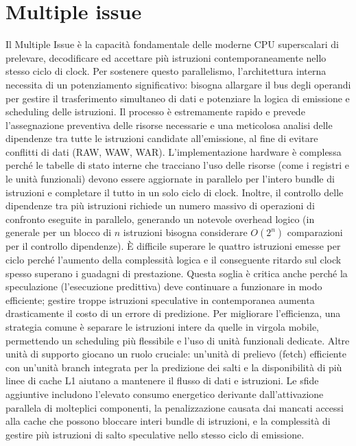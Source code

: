 \section{Multiple issue}
Il Multiple Issue è la capacità fondamentale delle moderne CPU superscalari di prelevare, decodificare ed accettare più istruzioni contemporaneamente nello stesso ciclo di clock. Per sostenere questo parallelismo, l'architettura interna necessita di un potenziamento significativo: bisogna allargare il bus degli operandi per gestire il trasferimento simultaneo di dati e potenziare la logica di emissione e scheduling delle istruzioni. Il processo è estremamente rapido e prevede l'assegnazione preventiva delle risorse necessarie e una meticolosa analisi delle dipendenze tra tutte le istruzioni candidate all'emissione, al fine di evitare conflitti di dati (RAW, WAW, WAR). L'implementazione hardware è complessa perché le tabelle di stato interne che tracciano l'uso delle risorse (come i registri e le unità funzionali) devono essere aggiornate in parallelo per l'intero bundle di istruzioni e completare il tutto in un solo ciclo di clock. Inoltre, il controllo delle dipendenze tra più istruzioni richiede un numero massivo di operazioni di confronto eseguite in parallelo, generando un notevole overhead logico (in generale per un blocco di $n$ istruzioni bisogna considerare $O(2^n)$ comparazioni per il controllo dipendenze). È difficile superare le quattro istruzioni emesse per ciclo perché l'aumento della complessità logica e il conseguente ritardo sul clock spesso superano i guadagni di prestazione. Questa soglia è critica anche perché la speculazione (l'esecuzione predittiva) deve continuare a funzionare in modo efficiente; gestire troppe istruzioni speculative in contemporanea aumenta drasticamente il costo di un errore di predizione. Per migliorare l'efficienza, una strategia comune è separare le istruzioni intere da quelle in virgola mobile, permettendo un scheduling più flessibile e l'uso di unità funzionali dedicate. Altre unità di supporto giocano un ruolo cruciale: un'unità di prelievo (fetch) efficiente con un'unità branch integrata per la predizione dei salti e la disponibilità di più linee di cache L1 aiutano a mantenere il flusso di dati e istruzioni. Le sfide aggiuntive includono l'elevato consumo energetico derivante dall'attivazione parallela di molteplici componenti, la penalizzazione causata dai mancati accessi alla cache che possono bloccare interi bundle di istruzioni, e la complessità di gestire più istruzioni di salto speculative nello stesso ciclo di emissione.

